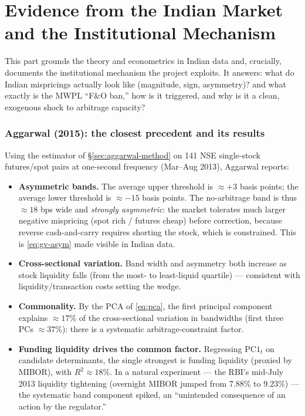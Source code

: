 \part{Evidence from the Indian Market and the Institutional Mechanism}
\label{part:india}

This part grounds the theory and econometrics in Indian data and, crucially, documents the institutional mechanism the project exploits. It answers: what do Indian mispricings actually look like (magnitude, sign, asymmetry)? and what exactly is the MWPL ``F\&O ban,'' how is it triggered, and why is it a clean, exogenous shock to arbitrage capacity?

\section{Aggarwal (2015): the closest precedent and its results}
\label{sec:aggarwal}
Using the estimator of \S\ref{sec:aggarwal-method} on 141 NSE single-stock futures/spot pairs at one-second frequency (Mar--Aug 2013), Aggarwal reports:
\begin{itemize}[leftmargin=1.4em,itemsep=2pt]
\item \textbf{Asymmetric bands.} The average upper threshold is $\approx +3$ basis points; the average lower threshold is $\approx -15$ basis points. The no-arbitrage band is thus $\approx 18$ bps wide and \emph{strongly asymmetric}: the market tolerates much larger negative mispricing (spot rich / futures cheap) before correction, because reverse cash-and-carry requires shorting the stock, which is constrained. This is \eqref{eq:gv-asym} made visible in Indian data.
\item \textbf{Cross-sectional variation.} Band width and asymmetry both increase as stock liquidity falls (from the most- to least-liquid quartile) --- consistent with liquidity/transaction costs setting the wedge.
\item \textbf{Commonality.} By the PCA of \eqref{eq:pca}, the first principal component explains $\approx 17\%$ of the cross-sectional variation in bandwidths (first three PCs $\approx 37\%$): there is a systematic arbitrage-constraint factor.
\item \textbf{Funding liquidity drives the common factor.} Regressing $\mathrm{PC1}_t$ on candidate determinants, the single strongest is funding liquidity (proxied by MIBOR), with $R^2\approx 18\%$. In a natural experiment --- the RBI's mid-July 2013 liquidity tightening (overnight MIBOR jumped from $7.88\%$ to $9.23\%$) --- the systematic band component spiked, an ``unintended consequence of an action by the regulator.''
\end{itemize}

